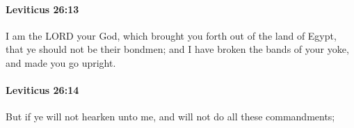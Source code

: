 		\paragraph{Leviticus 26:13} %
			\label{LEVITICUS-26-13}

			I am the LORD your God, which brought you forth out of the land of Egypt, that ye should not be their bondmen; and I have broken the bands of your yoke, and made you go upright.


		\paragraph{Leviticus 26:14} %
			\label{LEVITICUS-26-14}

			But if ye will not hearken unto me, and will not do all these commandments;


